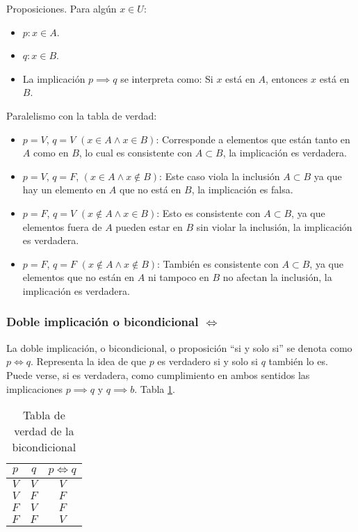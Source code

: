 Proposiciones. Para algún $x \in U$:
\begin{itemize}
	\item $p: x \in A$.
	\item $q: x \in B$.
	\item La implicación $p \implies q$ se interpreta como: Si $x$ está en $A$, entonces $x$ está en $B$.
\end{itemize}

Paralelismo con la tabla de verdad:
\begin{itemize}
	\item $p = V$, $q = V$ $\left(x \in A \land x \in B \right)$: Corresponde a elementos que están tanto en $A$ como en $B$, lo cual es consistente con $A \subset B$, la implicación es verdadera.
	\item $p=V$, $q = F$, $(x \in A \land x \not \in B)$: Este caso viola la inclusión $A \subset B$ ya que hay un elemento en $A$ que no está en $B$, la implicación es falsa.
	\item $p = F$, $q = V$ $(x \not \in A \land x \in B)$: Esto es consistente con $A \subset B$, ya que elementos fuera de $A$ pueden estar en $B$ sin violar la inclusión, la implicación es verdadera.
	\item $p = F$, $q = F$ $\left( x \not \in A \land x \not \in B \right)$: También es consistente con $A \subset B$, ya que elementos que no están en $A$ ni tampoco en $B$ no afectan la inclusión, la implicación es verdadera.
\end{itemize}


\subsubsection{Doble implicación o bicondicional $\iff$}     \label{sec:bicondicional}
 La doble implicación, o \gls{bicondicional}, o proposición ``si y solo si'' se denota como $p \iff q$. Representa la idea de que $p$ es verdadero si y solo si $q$ también lo es. Puede verse, si es verdadera, como cumplimiento en ambos sentidos las implicaciones $p \implies q$ y $q \implies b$. Tabla \ref{tab:bicondicional}.

\begin{table}[H]
	\centering
	\begin{tabular}{|c|c|c|} \hline
		$p$ & $q$ & $p \iff q$ \\ \hline
		$V$ & $V$ & $V$ \\
		$V$ & $F$ & $F$ \\
		$F$ & $V$ & $F$ \\
		$F$ & $F$ & $V$ \\ \hline
	\end{tabular}
	\caption{Tabla de verdad de la bicondicional}
	\label{tab:bicondicional}
\end{table}

